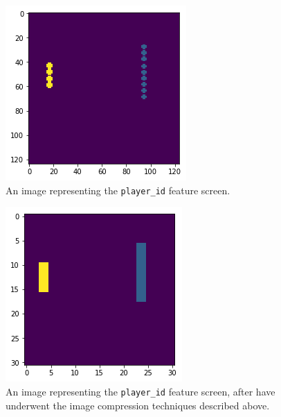 \documentclass{amsart}
\theoremstyle{definition}
\begin{document}
\begin{figure}[h!]
    \includegraphics[width=1.0\linewidth]{fine}
    \caption{An image representing the {\tt player\_id} feature screen.}
\end{figure}

\begin{figure}[h!]
    \includegraphics[width=1.0\linewidth]{course}
    \caption{An image representing the {\tt player\_id} feature screen, after have underwent the image compression techniques described above.}
\end{figure}

\end{document}
